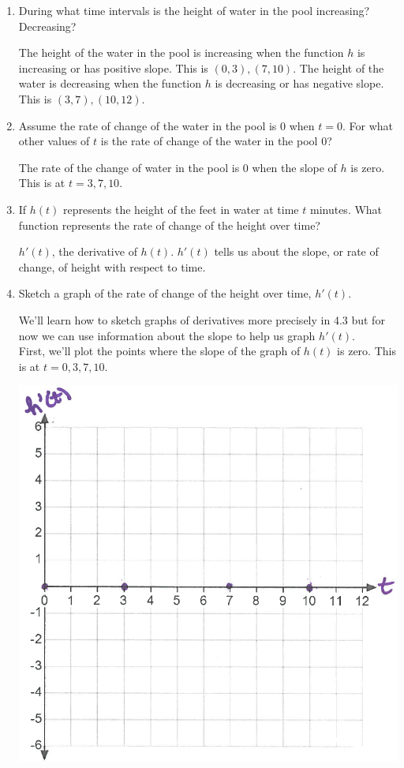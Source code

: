 \documentclass[nooutcomes]{ximera}
\begin{document}
\begin{problem}
	\begin{enumerate}
		\item During what time intervals is the height of water in the pool increasing? Decreasing?
			\begin{freeResponse}
			The height of the water in the pool is increasing when the function $h$ is increasing or has positive slope.  This is $(0,3),(7,10)$.  The height of the water is decreasing when the function $h$ is decreasing or has negative slope.  This is $(3,7),(10,12)$.
			\end{freeResponse}
		\item  Assume the rate of change of the water in the pool is $0$ when $t=0$.  For what other values of $t$ is the rate of change of the water in the pool $0$?
			\begin{freeResponse}
			The rate of the change of water in the pool is $0$ when the slope of $h$ is zero.  This is at $t=3,7,10$.
			\end{freeResponse}
		\item If $h(t)$ represents the height of the feet in water at time $t$ minutes.  What function represents the rate of change of the height over time?
			\begin{freeResponse}
				$h'(t)$, the derivative of $h(t)$.  $h'(t)$ tells us about the slope, or rate of change, of height with respect to time.
			\end{freeResponse}
		\item Sketch a graph of the rate of change of the height over time, $h'(t)$.
			\begin{freeResponse}
			We'll learn how to sketch graphs of derivatives more precisely in 4.3 but for now we can use information about the slope to help us graph $h'(t)$.\\
			First, we'll plot the points where the slope of the graph of $h(t)$ is zero.  This is at $t=0,3,7,10$.
			\begin{image}
			\includegraphics[scale=.4]{Figure10.png}

\end{image}
\end{freeResponse}
\end{enumerate}
\end{problem}
\end{document}
